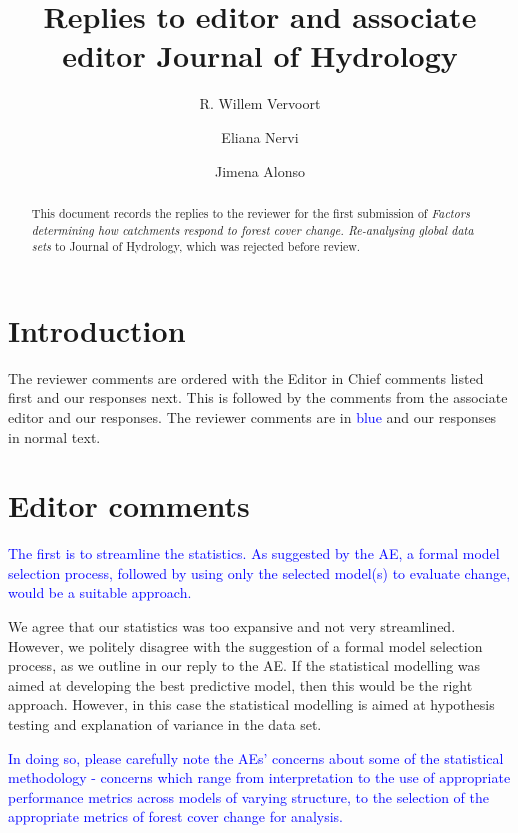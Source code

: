 \documentclass[]{elsarticle} %
\begin{document}
\begin{frontmatter}

  \title{Replies to editor and associate editor Journal of Hydrology}
    \author[]{R. Willem Vervoort}
  
    \author[]{Eliana Nervi}
  
    \author[]{Jimena Alonso}
  
  
  \begin{abstract}
  This document records the replies to the reviewer for the first submission of \emph{Factors determining how catchments respond to forest cover change. Re-analysing global data sets} to Journal of Hydrology, which was rejected before review.
  \end{abstract}
  
 \end{frontmatter}

\hypertarget{introduction}{%
\section{Introduction}\label{introduction}}

The reviewer comments are ordered with the Editor in Chief comments listed first and our responses next. This is followed by the comments from the associate editor and our responses. The reviewer comments are in \textcolor{blue}{blue} and our responses in normal text.

\hypertarget{editor-comments}{%
\section{Editor comments}\label{editor-comments}}

\textcolor{blue}{The first is to streamline the statistics.  As suggested by the AE, a formal model selection process, followed by using only the selected model(s) to evaluate change, would be a suitable approach.}

We agree that our statistics was too expansive and not very streamlined. However, we politely disagree with the suggestion of a formal model selection process, as we outline in our reply to the AE. If the statistical modelling was aimed at developing the best predictive model, then this would be the right approach. However, in this case the statistical modelling is aimed at hypothesis testing and explanation of variance in the data set.

\textcolor{blue}{In doing so, please carefully note the AEs' concerns about some of the statistical methodology - concerns which range from interpretation to the use of appropriate performance metrics across models of varying structure, to the selection of the appropriate metrics of forest cover change for analysis.}
\end{document}
